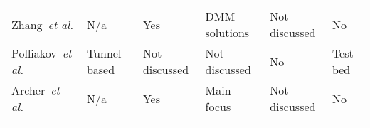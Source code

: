 \begin{table}[htb]
\begin{tabular}{p{3.6cm}p{2cm}p{2cm}p{2.2cm}p{2cm}p{2cm}}
    Zhang~\textit{et al.} \cite{Karimzadeh2014} &
    N/a & Yes & \ac{DMM} solutions & Not discussed & No \\
    \addlinespace
	\addlinespace
	
    Polliakov~\textit{et al.} \cite{Kempf2012a} &
    Tunnel-based & Not discussed & Not discussed & No & Test bed \\
    \addlinespace
	\addlinespace
	
    Archer~\textit{et al.} \cite{Kuklinski2014b} &
    N/a & Yes & Main focus & Not discussed & No \\
    \addlinespace
	\addlinespace
	
    \bottomrule
  \end{tabular}
\end{table}
